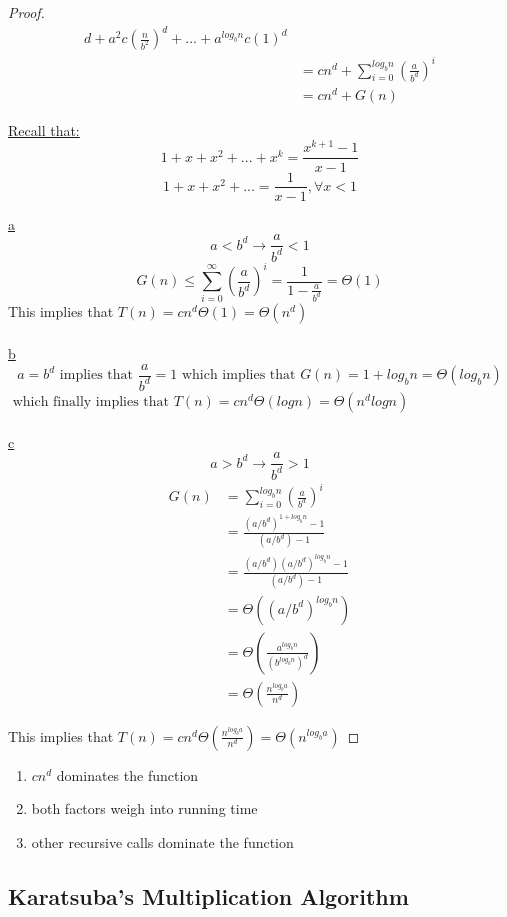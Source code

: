 \documentclass[12pt]{article}
\begin{document}
\begin{proof}
\begin{align*}
d + a^2 c (\frac{n}{b^2})^d + ... + a^{log_b n} c (1)^d\\
	&= cn^d + \sum^{log_b n}_{i=0} (\frac{a}{b^d})^i\\
	&= cn^d + G(n)
\end{align*}

\underline{Recall that:} $$1+x+x^2 + ... + x^k = \frac{x^{k+1}-1}{x-1}$$
$$1+x+x^2 + ... = \frac{1}{x-1}, \forall x<1$$

\underline{a} $$a<b^d \longrightarrow \frac{a}{b^d} < 1$$
$$G(n) \leq \sum^\infty_{i=0} (\frac{a}{b^d})^i = \frac{1}{1-\frac{a}{b^d}} = \Theta (1)$$
This implies that $T(n) = cn^d\Theta (1) = \Theta (n^d)$
\\
\\
\underline{b}
$$a = b^d \text{ implies that } \frac{a}{b^d} = 1 \text{ which implies that } G(n) = 1+ log_b n = \Theta (log_b n)$$
$\text{ which finally implies that } T(n) = cn^d\Theta (logn) = \Theta (n^d logn)$\\
\\
\underline{c}
$$a > b^d \longrightarrow \frac{a}{b^d} > 1$$
\begin{align*}
	G(n) &= \sum^{log_b n}_{i=0} (\frac{a}{b^d})^i\\
	&= \frac{(a/b^d)^{1+log_b n}-1}{(a/b^d)-1}\\
	&= \frac{(a/b^d)(a/b^d)^{log_b n}-1}{(a/b^d)-1}\\
	&= \Theta ((a/b^d)^{log_b n})\\
	&= \Theta (\frac{a^{log_b n}}{(b^{log_b n})^d})\\
	&= \Theta (\frac{n^{log_b a}}{n^d})
\end{align*}

This implies that $T(n) = cn^d \Theta (\frac{n^{log_b a}}{n^d}) = \Theta (n^{log_b a})$

\end{proof}

\begin{tcolorbox}[title=Intuition]
	\begin{enumerate}[label=\alph*]
	\item{$cn^d$ dominates the function}
	\item{both factors weigh into running time}
	\item{other recursive calls dominate the function}
\end{enumerate}
\end{tcolorbox}

\subsection{Karatsuba's Multiplication Algorithm}
\end{document}
